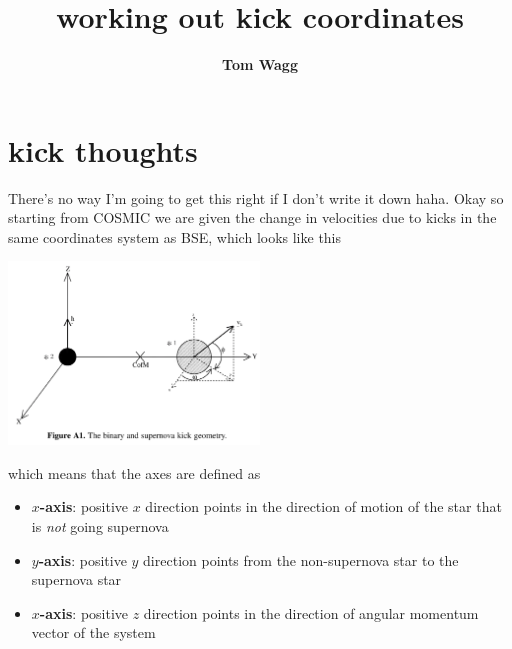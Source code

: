 \documentclass[12pt, letterpaper, twoside]{article}
\title{working out kick coordinates}
\author{\textbf{Tom Wagg}}
\begin{document}
\section*{kick thoughts}

There's no way I'm going to get this right if I don't write it down haha. Okay so starting from COSMIC we are given the change in velocities due to kicks in the same coordinates system as BSE, which looks like this
\begin{center}
    \includegraphics[width=0.5\textwidth]{static/bse_coordinates.png}
\end{center}
which means that the axes are defined as
\begin{itemize}
    \item \textbf{$x$-axis}: positive $x$ direction points in the direction of motion of the star that is \textit{not} going supernova
    \item \textbf{$y$-axis}: positive $y$ direction points from the non-supernova star to the supernova star
    \item \textbf{$x$-axis}: positive $z$ direction points in the direction of angular momentum vector of the system
\end{itemize}
\end{document}
